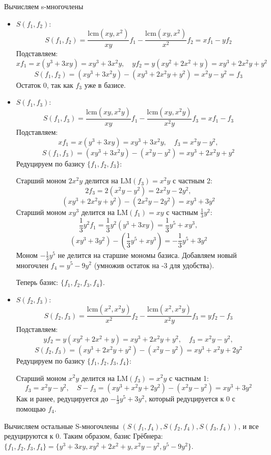 \documentclass[a4paper]{article}
\begin{document}
\begin{enumerate}
  Вычисляем s-многочлены

  \begin{itemize}
    \item  $S(f_1, f_2)$:
      \[
      S(f_1, f_2) = \frac{\text{lcm}(xy, x^2)}{xy} f_1 - 
      \frac{\text{lcm}(xy, x^2)}{x^2} f_2 = x f_1 - y f_2
      \]
      Подставляем:
      \[
      x f_1 = x(y^3 + 3xy) = xy^3 + 3x^2y, \quad y f_2 = y(xy^2 + 2x^2 + y) = 
      xy^3 + 2x^2y + y^2
      \]
      \[
      S(f_1, f_2) = (xy^3 + 3x^2y) - (xy^3 + 2x^2y + y^2) = x^2y - y^2 = f_3
      \]
      Остаток 0, так как \( f_3 \) уже в базисе.
    
    \item  $S(f_1, f_3)$:
      \[
      S(f_1, f_3) = \frac{\text{lcm}(xy, x^2y)}{xy} f_1 -
       \frac{\text{lcm}(xy, x^2y)}{x^2y} f_3 = x f_1 - f_3
      \]
      Подставляем:
      \[
      x f_1 = x(y^3 + 3xy) = xy^3 + 3x^2y, \quad f_3 = x^2y - y^2,
      \]
      \[
      S(f_1, f_3) = (xy^3 + 3x^2y) - (x^2y - y^2) = xy^3 + 2x^2y + y^2
      \]
      Редуцируем по базису \( \{f_1, f_2, f_3\} \):
      
      Старший моном \( 2x^2y \) делится на \( \text{LM}(f_3) = x^2y \) с частным 2:
        \[
        2 f_3 = 2(x^2y - y^2) = 2x^2y - 2y^2,
        \]
        \[
        (xy^3 + 2x^2y + y^2) - (2x^2y - 2y^2) = xy^3 + 3y^2
        \]
       Старший моном \( xy^3 \) делится на \( \text{LM}(f_1) = xy \) с частным
       \( \frac{1}{3} y^2 \):
        \[
        \frac{1}{3} y^2 f_1 = \frac{1}{3} y^2 (y^3 + 3xy) = \frac{1}{3} y^5 + xy^3,
        \]
        \[
        (xy^3 + 3y^2) - \left( \frac{1}{3} y^5 + xy^3 \right) = -\frac{1}{3} y^5 + 3y^2
        \]
       Моном \( -\frac{1}{3} y^5 \) не делится на старшие мономы базиса. Добавляем новый
        многочлен \( f_4 = y^5 - 9y^2 \) (умножив остаток на -3 для удобства).
    
      Теперь базис: \( \{f_1, f_2, f_3, f_4\} \).

    \item$S(f_2, f_3)$:
    \[
    S(f_2, f_3) = \frac{\text{lcm}(x^2, x^2y)}{x^2} f_2 -
     \frac{\text{lcm}(x^2, x^2y)}{x^2y} f_3 = y f_2 - f_3
    \]
    Подставляем:
    \[
    y f_2 = y(xy^2 + 2x^2 + y) = xy^3 + 2x^2y + y^2, \quad f_3 = x^2y - y^2,
    \]
    \[
    S(f_2, f_3) = (xy^3 + 2x^2y + y^2) - (x^2y - y^2) = xy^3 + x^2y + 2y^2
    \]
    Редуцируем по базису \( \{f_1, f_2, f_3, f_4\} \):
    
    Старший моном \( x^2y \) делится на \( \text{LM}(f_3) = x^2y \) с частным 1:
      \[
      f_3 = x^2y - y^2, \quad S - f_3 = (xy^3 + x^2y + 2y^2) - 
      (x^2y - y^2) = xy^3 + 3y^2
      \]
    Как и ранее, редуцируется до \( -\frac{1}{3} y^5 + 3y^2 \), который редуцируется к
     0 с помощью \( f_4 \).
  \end{itemize}
  Вычисляем остальные S-многочлены $(S(f_1, f_4), S(f_2, f_4), S(f_3, f_4))$, и
   все редуцируются к 0. Таким образом, базис Грёбнера: 
   \( \{f_1, f_2, f_3, f_4\} = \{y^3 + 3xy,  xy^2 + 2x^2 + y,  x^2y - y^2,  y^5 - 9y^2\} \).


\end{enumerate}
\end{document}
